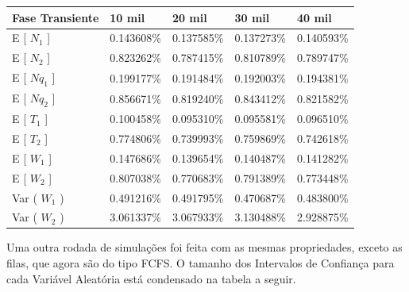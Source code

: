 \documentclass[a4paper,10pt]{article}
\begin{document}
\begin{center}
\begin{tabular} { | l | l | l | l | l | }
    \hline
    Fase Transiente & 10 mil     & 20 mil     & 30 mil     & 40 mil \\ \hline
    E [ $N_1$ ]     & 0.143608\% & 0.137585\% & 0.137273\% & 0.140593\% \\ \hline
    E [ $N_2$ ]     & 0.823262\% & 0.787415\% & 0.810789\% & 0.789747\% \\ \hline
    E [ $Nq_1$ ]    & 0.199177\% & 0.191484\% & 0.192003\% & 0.194381\% \\ \hline
    E [ $Nq_2$ ]    & 0.856671\% & 0.819240\% & 0.843412\% & 0.821582\% \\ \hline
    E [ $T_1$ ]     & 0.100458\% & 0.095310\% & 0.095581\% & 0.096510\% \\ \hline
    E [ $T_2$ ]     & 0.774806\% & 0.739993\% & 0.759869\% & 0.742618\% \\ \hline
    E [ $W_1$ ]     & 0.147686\% & 0.139654\% & 0.140487\% & 0.141282\% \\ \hline
    E [ $W_2$ ]     & 0.807038\% & 0.770683\% & 0.791389\% & 0.773448\% \\ \hline
    Var ( $W_1$ )   & 0.491216\% & 0.491795\% & 0.470687\% & 0.483800\% \\ \hline
    Var ( $W_2$ )   & 3.061337\% & 3.067933\% & 3.130488\% & 2.928875\% \\ \hline
\end{tabular}
\end{center}

    Uma outra rodada de simulações foi feita com as mesmas propriedades, exceto as filas, que agora são do tipo FCFS. O tamanho dos Intervalos de Confiança para cada Variável Aleatória está condensado na tabela a seguir.
\end{document}
